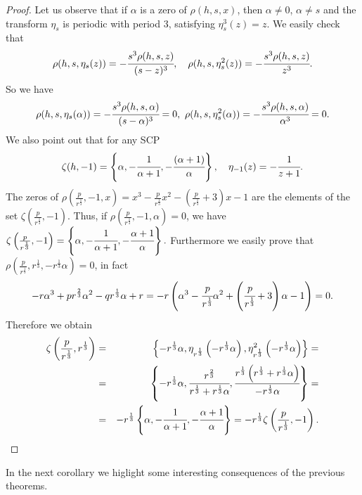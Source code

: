 \documentclass[12pt,reqno]{article}
\begin{document}
\begin{proof}
Let us observe that if $\alpha$ is a zero of $\rho(h,s,x)$, then $\alpha\not=0$, $\alpha\not=s$  and the transform $\eta_s$ is periodic with period 3, satisfying $\eta_s^3(z)=z$. We easily check that
$$\rho(h,s,\eta_s(z))=-\cfrac{s^3\rho(h,s,z)}{(s-z)^3},\quad \rho(h,s,\eta_s^2(z))=-\cfrac{s^3\rho(h,s,z)}{z^3}.$$
So we have
$$\rho(h,s,\eta_s(\alpha))=-\cfrac{s^3\rho(h,s,\alpha)}{(s-\alpha)^3}=0,\  \rho(h,s,\eta_s^2(\alpha))=-\cfrac{s^3\rho(h,s,\alpha)}{\alpha^3}=0.$$
We also point out that for any SCP 
$$\zeta(h,-1)=\left\{\alpha,-\cfrac{1}{\alpha + 1},-\cfrac{(\alpha + 1)}{\alpha}\right\} ,\quad \eta_{-1}(z)=-\cfrac{1}{z + 1}.$$
The zeros of $\rho\left(\frac{p}{r^{\frac{1}{3}}},-1,x\right)=x^3-\frac{p}{r^{\frac{1}{3}}}x^2-\left(\frac{p}{r^{\frac{1}{3}}}+3\right)x-1$ are the elements of the set $\zeta\left(\frac{p}{r^{\frac{1}{3}}},-1\right)$. Thus, if  $\rho\left(\frac{p}{r^{\frac{1}{3}}},-1,\alpha\right)=0$, we have
$\zeta\left(\frac{p}{r^{\frac{1}{3}}},-1\right)=\left\{\alpha,-\cfrac{1}{\alpha+1},-\cfrac{\alpha+1}{\alpha}\right\}.$
Furthermore we easily prove that $\rho\left(\frac{p}{r^{\frac{1}{3}}},r^{\frac{1}{3}},-r^{\frac{1}{3}}\alpha\right)=0$, in fact
$$-r\alpha^3+pr^{\frac{2}{3}}\alpha^2-qr^{\frac{1}{3}}\alpha+r=-r\left(\alpha^3-\cfrac{p}{r^{\frac{1}{3}}}\alpha^2+\left(\cfrac{p}{r^{\frac{1}{3}}}+3\right)\alpha-1\right)=0.$$
Therefore we obtain
\begin{eqnarray*}
\zeta\left(\frac{p}{r^{\frac{1}{3}}},r^{\frac{1}{3}}\right)&=&\left\lbrace-r^{\frac{1}{3}}\alpha,\eta_{r^{\frac{1}{3}}}\left(-r^{\frac{1}{3}}\alpha\right),\eta_{r^{\frac{1}{3}}}^2\left(-r^{\frac{1}{3}}\alpha\right)\right\rbrace=\\
 &=&\left\{-r^{\frac{1}{3}}\alpha,\cfrac{r^{\frac{2}{3}}}{r^{\frac{1}{3}}+r^{\frac{1}{3}}\alpha},\cfrac{r^{\frac{1}{3}}\left(r^{\frac{1}{3}}+r^{\frac{1}{3}}\alpha\right)}{-r^{\frac{1}{3}}\alpha}\right\}=\\
 &=&-r^{\frac{1}{3}}\left\{\alpha,-\cfrac{1}{\alpha+1},-\cfrac{\alpha+1}{\alpha}\right\}=-r^{\frac{1}{3}}\zeta\left(\frac{p}{r^{\frac{1}{3}}},-1\right).
\end{eqnarray*}
\end{proof}
In the next corollary we higlight some interesting consequences of the previous theorems.
\end{document}
